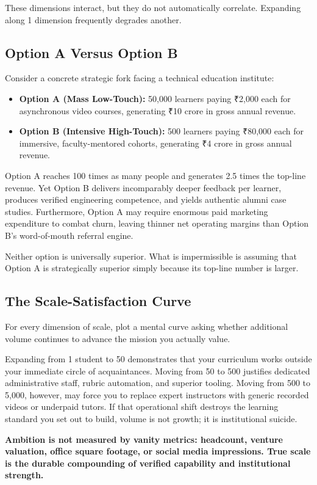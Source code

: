 These dimensions interact, but they do not automatically correlate. Expanding along 1 dimension frequently degrades another.

\subsection{Option A Versus Option B}

Consider a concrete strategic fork facing a technical education institute:

\begin{itemize}[leftmargin=11pt,itemsep=2pt,topsep=1.5pt,parsep=0pt]
  \item \textbf{Option A (Mass Low-Touch):} 50,000 learners paying ₹2,000 each for asynchronous video courses, generating ₹10 crore in gross annual revenue.
  \item \textbf{Option B (Intensive High-Touch):} 500 learners paying ₹80,000 each for immersive, faculty-mentored cohorts, generating ₹4 crore in gross annual revenue.
\end{itemize}

Option A reaches 100 times as many people and generates 2.5 times the top-line revenue. Yet Option B delivers incomparably deeper feedback per learner, produces verified engineering competence, and yields authentic alumni case studies. Furthermore, Option A may require enormous paid marketing expenditure to combat churn, leaving thinner net operating margins than Option B's word-of-mouth referral engine.

Neither option is universally superior. What is impermissible is assuming that Option A is strategically superior simply because its top-line number is larger.

\subsection{The Scale-Satisfaction Curve}

For every dimension of scale, plot a mental curve asking whether additional volume continues to advance the mission you actually value.

Expanding from 1 student to 50 demonstrates that your curriculum works outside your immediate circle of acquaintances. Moving from 50 to 500 justifies dedicated administrative staff, rubric automation, and superior tooling. Moving from 500 to 5,000, however, may force you to replace expert instructors with generic recorded videos or underpaid tutors. If that operational shift destroys the learning standard you set out to build, volume is not growth; it is institutional suicide.

\textbf{Ambition is not measured by vanity metrics: headcount, venture valuation, office square footage, or social media impressions. True scale is the durable compounding of verified capability and institutional strength.}
